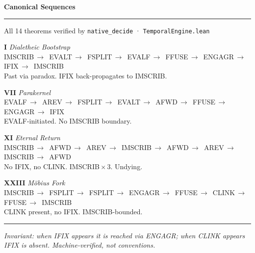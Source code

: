 \documentclass[10pt]{article}
\newcommand{\op}[2]{{\color{#1}\ttfamily #2}}
\newcommand{\tok}[2]{{\color{#1}\small\ttfamily #2}}
\newcommand{\arr}{{\color{dim}\small\,$\to$\,}}
\newcommand{\shead}[1]{%
  {\large\bfseries\color{shead} #1}%
  \\[-2pt]{\color{hrule}\rule{\linewidth}{0.5pt}}\par\vspace{4pt}}
\begin{document}
\hspace{0.012\textwidth}%
{\color{hrule}\vrule width 0.5pt}%
\hspace{0.012\textwidth}%
\begin{minipage}[t]{0.338\textwidth}

\shead{Canonical Sequences}

{\color{dim}\small All 14 theorems verified by
  \texttt{native\_decide} · \texttt{TemporalEngine.lean}}

\vspace{9pt}

{\normalsize\bfseries I}\enspace
{\normalsize\itshape Dialetheic Bootstrap}\\[4pt]
\tok{logical}{IMSCRIB}\arr
\tok{dial}{EVALT}\arr
\tok{frob}{FSPLIT}\arr
\tok{dial}{EVALF}\arr
\tok{frob}{FFUSE}\arr
\tok{dial}{ENGAGR}\arr
\tok{lin}{IFIX}\arr
\tok{logical}{IMSCRIB}\\[3pt]
{\color{dim}\small Past via paradox.
  \op{lin}{IFIX} back-propagates to \op{logical}{IMSCRIB}.}

\vspace{9pt}

{\normalsize\bfseries VII}\enspace
{\normalsize\itshape Parakernel}\\[4pt]
\tok{dial}{EVALF}\arr
\tok{logical}{AREV}\arr
\tok{frob}{FSPLIT}\arr
\tok{dial}{EVALT}\arr
\tok{logical}{AFWD}\arr
\tok{frob}{FFUSE}\arr
\tok{dial}{ENGAGR}\arr
\tok{lin}{IFIX}\\[3pt]
{\color{dim}\small \op{dial}{EVALF}-initiated. No \op{logical}{IMSCRIB} boundary.}

\vspace{9pt}

{\normalsize\bfseries XI}\enspace
{\normalsize\itshape Eternal Return}\\[4pt]
\tok{logical}{IMSCRIB}\arr
\tok{logical}{AFWD}\arr
\tok{logical}{AREV}\arr
\tok{logical}{IMSCRIB}\arr
\tok{logical}{AFWD}\arr
\tok{logical}{AREV}\arr
\tok{logical}{IMSCRIB}\arr
\tok{logical}{AFWD}\\[3pt]
{\color{dim}\small No \op{lin}{IFIX}, no \op{logical}{CLINK}.
  \op{logical}{IMSCRIB}\,$\times$\,3. Undying.}

\vspace{9pt}

{\normalsize\bfseries XXIII}\enspace
{\normalsize\itshape M\"obius Fork}\\[4pt]
\tok{logical}{IMSCRIB}\arr
\tok{frob}{FSPLIT}\arr
\tok{frob}{FSPLIT}\arr
\tok{dial}{ENGAGR}\arr
\tok{frob}{FFUSE}\arr
\tok{logical}{CLINK}\arr
\tok{frob}{FFUSE}\arr
\tok{logical}{IMSCRIB}\\[3pt]
{\color{dim}\small \op{logical}{CLINK} present, no \op{lin}{IFIX}.
  \op{logical}{IMSCRIB}-bounded.}

\vspace{10pt}
{\color{hrule}\rule{\linewidth}{0.4pt}}
\vspace{5pt}

{\color{dim}\small\itshape
Invariant: when \op{lin}{IFIX} appears it is reached via
\op{dial}{ENGAGR}; when \op{logical}{CLINK} appears
\op{lin}{IFIX} is absent. Machine-verified, not conventions.}

\end{minipage}
\end{document}
